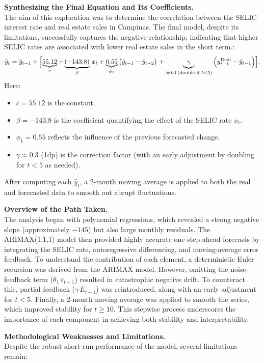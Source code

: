 \documentclass[10pt]{article}
\begin{document}
\textbf{Synthesizing the Final Equation and Its Coefficients.}\\[1mm]
The aim of this exploration was to determine the correlation between the SELIC interest rate and real estate sales in Campinas. The final model, despite its limitations, successfully captures the negative relationship, indicating that higher SELIC rates are associated with lower real estate sales in the short term.:
\[
\hat{y}_t = \hat{y}_{t-1} + \Bigl[
    \underbrace{55.12}_{c} 
    + \underbrace{(-143.8)}_{\beta}\,x_t 
    + \underbrace{0.55}_{\phi_1}\,\bigl(\hat{y}_{t-1} - \hat{y}_{t-2}\bigr)
    + \underbrace{\gamma}_{\approx 0.3\;(\text{double if }t<5)}\,\Bigl(y_{t-1}^\mathrm{Real} - \hat{y}_{t-1}\Bigr)
\Bigr].
\]
Here:
\begin{itemize}
    \item \(c = 55.12\) is the constant.
    \item \(\beta = -143.8\) is the coefficient quantifying the effect of the SELIC rate \(x_t\).
    \item \(\phi_1 = 0.55\) reflects the influence of the previous forecasted change.
    \item \(\gamma \approx 0.3\) (1dp) is the correction factor (with an early adjustment by doubling for \(t<5\) as needed).
\end{itemize}
After computing each \(\hat{y}_t\), a 2-month moving average is applied to both the real and forecasted data to smooth out abrupt fluctuations.

\textbf{Overview of the Path Taken.}\\[1mm]
The analysis began with polynomial regressions, which revealed a strong negative slope (approximately \(-145\)) but also large monthly residuals. The ARIMAX(1,1,1) model then provided highly accurate one-step-ahead forecasts by integrating the SELIC rate, autoregressive differencing, and moving-average error feedback. To understand the contribution of each element, a deterministic Euler recursion was derived from the ARIMAX model. However, omitting the noise-feedback term (\(\theta_1\,\varepsilon_{t-1}\)) resulted in catastrophic negative drift. To counteract this, partial feedback (\(\gamma\,E_{t-1}\)) was reintroduced, along with an early adjustment for \(t<5\). Finally, a 2-month moving average was applied to smooth the series, which improved stability for \(t \geq 10\). This stepwise process underscores the importance of each component in achieving both stability and interpretability.

\textbf{Methodological Weaknesses and Limitations.}\\[1mm]
Despite the robust short-run performance of the model, several limitations remain:
\end{document}
